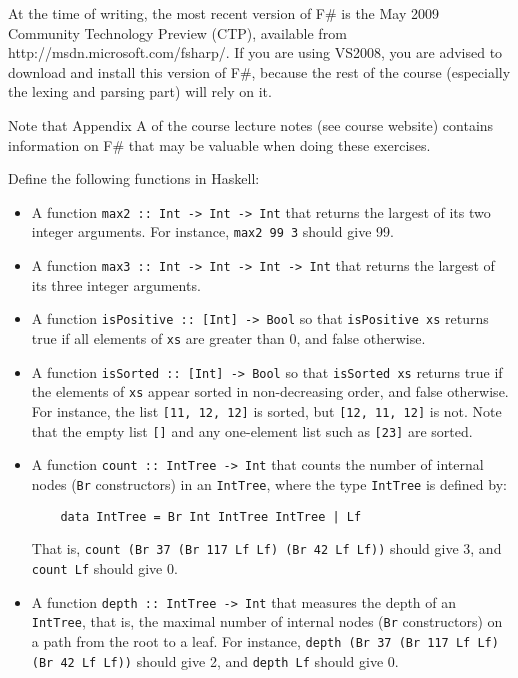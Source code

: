 \documentclass[a4paper]{article}
\begin{document}
At the time of writing, the most recent version of F\# is the May 2009
Community Technology Preview (CTP), available from
http://msdn.microsoft.com/fsharp/.  If you are using VS2008, you are
advised to download and install this version of F\#, because the rest
of the course (especially the lexing and parsing part) will rely on
it.

Note that Appendix A of the course lecture notes (see course website)
contains information on F\# that may be valuable when doing these
exercises.



\begin{exercise}\label{exer-fsharp-functions}
  Define the following functions in Haskell: {\color{red}{This exercise isn't in the book, but I've translated the questions and the answers anyway.}}

\begin{itemize}
\item A function \texttt{max2 ::\ Int -> Int -> Int} that returns the
  largest of its two integer arguments.  For instance, \texttt{max2 99
    3} should give 99.
  
\item A function \texttt{max3 ::\ Int -> Int -> Int -> Int} that returns
  the largest of its three integer arguments.
  
\item A function \texttt{isPositive ::\ [Int] -> Bool} so that
  \texttt{isPositive xs} returns true if all elements of \texttt{xs}
  are greater than 0, and false otherwise.
  
\item A function \texttt{isSorted ::\ [Int] -> Bool} so that
  \texttt{isSorted xs} returns true if the elements of \texttt{xs}
  appear sorted in non-decreasing order, and false otherwise.  For
  instance, the list \texttt{[11, 12, 12]} is sorted, but \texttt{[12,
    11, 12]} is not.  Note that the empty list \texttt{[]} and any
  one-element list such as \texttt{[23]} are sorted.
  
\item A function \texttt{count ::\ IntTree -> Int} that counts the
  number of internal nodes (\texttt{Br} constructors) in an
  \texttt{IntTree}, where the type \texttt{IntTree} is defined by:
  {\codesetup\begin{verbatim}
    data IntTree = Br Int IntTree IntTree | Lf \end{verbatim}}
  That is, \texttt{count (Br 37 (Br 117
    Lf Lf) (Br 42 Lf Lf))} should give 3, and \texttt{count Lf}
  should give 0.
  
\item A function \texttt{depth ::\ IntTree -> Int} that measures the
  depth of an \texttt{IntTree}, that is, the maximal number of
  internal nodes (\texttt{Br} constructors) on a path from the root to
  a leaf.  For instance, \texttt{depth (Br 37 (Br 117
    Lf Lf) (Br 42 Lf Lf))} should give 2, and \texttt{depth Lf} should give
  0.
\end{itemize}
\end{exercise}
\end{document}

